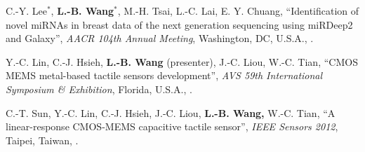 \documentclass[a4paper,12pt,oneside]{article}
\begin{document}
\begin{body}
\begin{publication}[widest*=100]
    \item
        C.-Y. Lee$^*$, \textbf{L.-B. Wang}$^*$, M.-H. Tsai, L.-C. Lai, E. Y. Chuang,
        ``Identification of novel miRNAs in breast data of the next generation sequencing using miRDeep2 and Galaxy'',
        \textit{AACR 104th Annual Meeting},
        Washington, DC, U.S.A.,
        .

    \item
        Y.-C. Lin, C.-J. Hsieh, \textbf{L.-B. Wang} (presenter), J.-C. Liou, W.-C. Tian,
        ``CMOS MEMS metal-based tactile sensors development'',
        \textit{AVS 59th International Symposium \& Exhibition},
        Florida, U.S.A.,
        .

    \item
        C.-T. Sun, Y.-C. Lin, C.-J. Hsieh, J.-C. Liou, \textbf{L.-B. Wang,} W.-C. Tian,
        ``A linear-response CMOS-MEMS capacitive tactile sensor'',
        \textit{IEEE Sensors 2012},
        Taipei, Taiwan,
        .

\end{publication}



%
%



\end{body}
\end{document}

